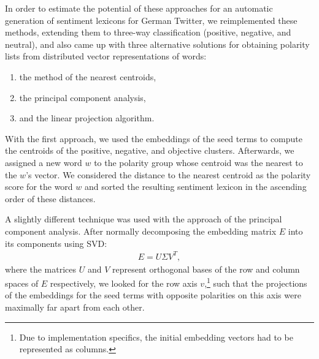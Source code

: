 In order to estimate the potential of these approaches for an
automatic generation of sentiment lexicons for German Twitter, we
reimplemented these methods, extending them to three-way
classification (positive, negative, and neutral), and also came up
with three alternative solutions for obtaining polarity lists from
distributed vector representations of words:
\begin{enumerate}
  \item the method of the nearest centroids,
  \item the principal component analysis,
  \item and the linear projection algorithm.
\end{enumerate}

With the first approach, we used the embeddings of the seed terms to
compute the centroids of the positive, negative, and objective
clusters.  Afterwards, we assigned a new word $w$ to the polarity
group whose centroid was the nearest to the $w$'s vector.  We
considered the distance to the nearest centroid as the polarity score
for the word $w$ and sorted the resulting sentiment lexicon in the
ascending order of these distances.


A slightly different technique was used with the approach of the
principal component analysis.  After normally decomposing the
embedding matrix $E$ into its components using SVD:
\begin{align*}
  E = U \Sigma V^T,
\end{align*}
where the matrices $U$ and $V$ represent orthogonal bases of the row
and column spaces of $E$ respectively, we looked for the row axis
$v$,\footnote{Due to implementation specifics, the initial embedding
  vectors had to be represented as columns.} such that the projections
of the embeddings for the seed terms with opposite polarities on this
axis were maximally far apart from each other.

